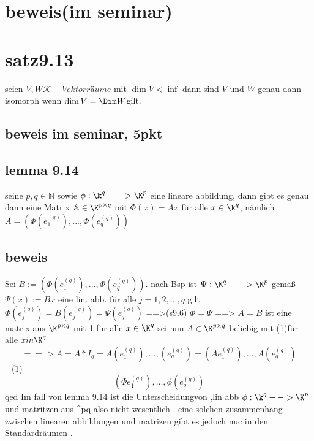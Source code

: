 \documentclass[11pt]{article}
\begin{document}
{\section{beweis(im seminar)}
\section{satz9.13}
seien $V,W \mathcal{K}-Vektorräume$ mit $\dim V < \inf$ dann sind $V$ und $W$ genau dann isomorph wenn $\dim V=\Dim W $gilt.
\subsection{beweis im seminar, 5pkt}
\subsection{lemma 9.14}
seine $p,q \in \mathbb{N}$ sowie $\phi : \k^q-->\K^p$ eine lineare abbildung, dann gibt es genau dann eine Matrix $\mathbb{A} \in \K^{p\times q}$ mit $\Phi(x)=Ax$
für alle $x \in \k^q$, nämlich $A= (\Phi(e_1^(q)),...,\Phi(e_q^(q)))$
\subsection{beweis}
Sei $B:= (\Phi(e_1^(q)),...,\Phi(e_q^(q)))$. nach Bsp ist $\Psi:\K^q-->\K^p$ gemäß $\Psi(x):= Bx$
eine lin. abb. für alle $j=1,2,...,q$ gilt $\Phi (e_j^(q))= B(e_j^(q))= \Psi(e_j^(q))$
==>(s9.6) $\Phi=\Psi$
==> $A=B$ ist eine matrix aus $\K^{p\times q}$ mit 
1
für alle $x \in \K^q$
sei nun $A \in \K^{p \times q}$  beliebig mit (1)für alle $x in \K^q$
\[==> A=A*I_q=A(e_1^(q)),...,(e_q^(q))=(Ae_1^(q)),...,A(e_q^(q))\]
=(1)
\[(\Phi e_1^(q)),...,\phi(e_q^(q))\]
qed
Im fall von lemma 9.14 ist die Unterscheidungvon ,lin abb $ \phi : \k^q-->\K^p $und matritzen aus \K^p\times q also nicht wesentlich . eine solchen 
zusammenhang zwischen linearen abbildungen und matrizen gibt es jedoch nuc in den Standardräumen .

}
\end{document}
